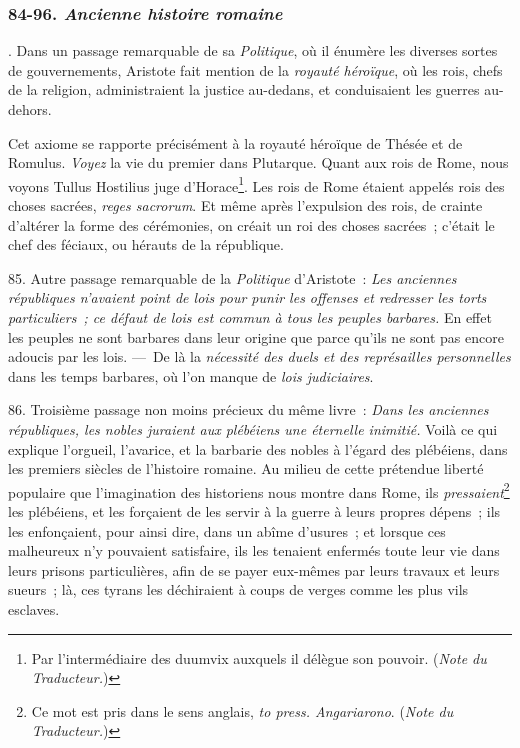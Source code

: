 \documentclass[french,twoside]{book} %
\begin{document}
\subsubsection[{84-96. Ancienne histoire romaine}]{ \textsc{84-96. } {\itshape Ancienne histoire romaine} }
. Dans un passage remarquable de sa {\itshape Politique}, où il énumère les diverses sortes de gouvernements, Aristote fait mention de la {\itshape royauté héroïque}, où les rois, chefs de la religion, administraient la justice au-dedans, et conduisaient les guerres au-dehors.\par
Cet axiome se rapporte précisément à la royauté héroïque de Thésée et de Romulus. {\itshape Voyez} la vie du premier dans Plutarque. Quant aux rois de Rome, nous voyons Tullus Hostilius juge d’Horace\footnote{Par l’intermédiaire des duumvix auxquels il délègue son pouvoir. ({\itshape Note du Traducteur.})}. Les rois de Rome étaient appelés rois des choses sacrées, {\itshape reges sacrorum}. Et même après l’expulsion des rois, de crainte d’altérer la forme des cérémonies, on créait un roi des choses sacrées ; c’était le chef des féciaux, ou hérauts de la république.\par
85. Autre passage remarquable de la {\itshape Politique} d’Aristote : \emph{{\itshape Les anciennes républiques n’avaient point de lois pour punir les offenses et redresser les torts particuliers ; ce défaut de lois est commun à tous les peuples barbares.}} En effet les peuples ne sont barbares dans leur origine que parce qu’ils ne sont pas encore adoucis par les lois. — De là la {\itshape nécessité des duels et des représailles personnelles} dans les temps barbares, où l’on manque de {\itshape lois judiciaires}.\par
 86. Troisième passage non moins précieux du même livre : \emph{{\itshape Dans les anciennes républiques, les nobles juraient aux plébéiens une éternelle inimitié.}} Voilà ce qui explique l’orgueil, l’avarice, et la barbarie des nobles à l’égard des plébéiens, dans les premiers siècles de l’histoire romaine. Au milieu de cette prétendue liberté populaire que l’imagination des historiens nous montre dans Rome, ils {\itshape pressaient}\footnote{Ce mot est pris dans le sens anglais, {\itshape to press. Angariarono}. ({\itshape Note du Traducteur.})} les plébéiens, et les forçaient de les servir à la guerre à leurs propres dépens ; ils les enfonçaient, pour ainsi dire, dans un abîme d’usures ; et lorsque ces malheureux n’y pouvaient satisfaire, ils les tenaient enfermés toute leur vie dans leurs prisons particulières, afin de se payer eux-mêmes par leurs travaux et leurs sueurs ; là, ces tyrans les déchiraient à coups de verges comme les plus vils esclaves.\par
\end{document}
